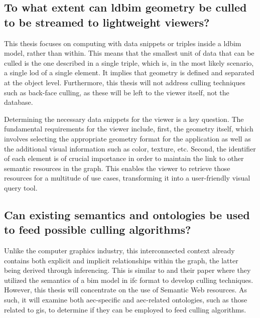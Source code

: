 \subsection[Can \acs{ldbim} be culled?]{To what extent can \acs{ldbim} geometry be culled \\
	to be streamed to lightweight viewers?}

This thesis focuses on computing with data snippets or triples inside a \ac{ldbim} model, rather than within. This means that the smallest unit of data that can be culled is the one described in a single triple, which is, in the most likely scenario, a single \ac{lod} of a single element. It implies that geometry is defined and separated at the object level. Furthermore, this thesis will not address culling techniques such as back-face culling, as these will be left to the viewer itself, not the database.

Determining the necessary data snippets for the viewer is a key question. The fundamental requirements for the viewer include, first, the geometry itself, which involves selecting the appropriate geometry format for the application as well as the additional visual information such as color, texture, etc. Second, the identifier of each element is of crucial importance in order to maintain the link to other semantic resources in the graph. This enables the viewer to retrieve those resources for a multitude of use cases, transforming it into a user-friendly visual query tool.

\subsection[Can existing semantics be used?]{Can existing semantics and ontologies be used\\
	to feed possible culling algorithms?}\label{subsec:rq2}
Unlike the computer graphics industry, this interconnected context already contains both explicit and implicit relationships within the graph, the latter being derived through inferencing. This is similar to \cite{Johansson2009} and their paper where they utilized the semantics of a \ac{bim} model in \ac{ifc} format to develop culling techniques. However, this thesis will concentrate on the use of Semantic Web resources. As such, it will examine both \ac{aec}-specific and \ac{aec}-related ontologies, such as those related to \ac{gis}, to determine if they can be employed to feed culling algorithms.
